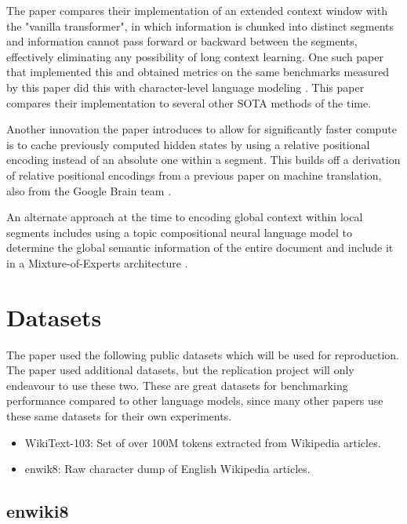 \documentclass[11pt]{article}
\begin{document}
The paper compares their implementation of an extended context window with the "vanilla transformer", in which information is chunked into distinct segments and information cannot pass forward or backward between the segments, effectively eliminating any possibility of long context learning. One such paper that implemented this and obtained metrics on the same benchmarks measured by this paper did this with character-level language modeling \cite{alrfou2018characterlevellanguagemodelingdeeper}. This paper compares their implementation to several other SOTA methods of the time.

Another innovation the paper introduces to allow for significantly faster compute is to cache previously computed hidden states by using a relative positional encoding instead of an absolute one within a segment. This builds off a derivation of relative positional encodings from a previous paper on machine translation, also from the Google Brain team \cite{shaw2018selfattentionrelativepositionrepresentations}.

An alternate approach at the time to encoding global context within local segments includes using a topic compositional neural language model to determine the global semantic information of the entire document and include it in a Mixture-of-Experts architecture \cite{wang2018topiccompositionalneurallanguage}.

\section{Datasets}

The paper used the following public datasets which will be used for reproduction. The paper used additional datasets, but the replication project will only endeavour to use these two. These are great datasets for benchmarking performance compared to other language models, since many other papers use these same datasets for their own experiments.

\begin{itemize}
\item WikiText-103: Set of over 100M tokens extracted from Wikipedia articles.
\item enwik8: Raw character dump of English Wikipedia articles.
\end{itemize}

\subsection{enwiki8}
\end{document}
